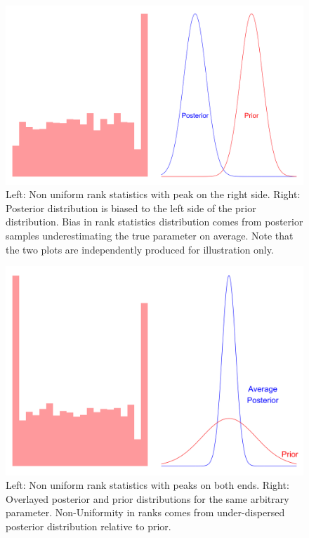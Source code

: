 \documentclass[12pt, a4paper]{article}
\begin{document}
            \begin{figure}[H]
                \centering
                \includegraphics[scale=0.07]{methodology/rhs.png}
                \caption{Left: Non uniform rank statistics with peak on the right side. Right: Posterior distribution is biased to the left side of the prior distribution. Bias in rank statistics distribution comes from posterior samples underestimating the true parameter on average. Note that the two plots are independently produced for illustration only.}
                \label{fig:underestimation}
            \end{figure}        

            \begin{figure}[H]
                \centering
                \includegraphics[scale=0.07]{methodology/underdispersed.png}
                \caption{Left: Non uniform rank statistics with peaks on both ends. Right: Overlayed posterior and prior distributions for the same arbitrary parameter. Non-Uniformity in ranks comes from under-dispersed posterior distribution relative to prior.}
                \label{fig:underdispersed}
            \end{figure}
\end{document}
